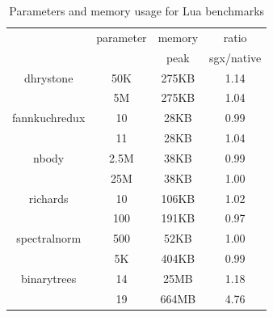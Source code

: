 \newcommand{\lowparamcolor}{\rowcolor[rgb]{0.99,0.79,0.64}\cellcolor{white}}
\newcommand{\higparamcolor}{\rowcolor[rgb]{0.75,0.84,0.91}\cellcolor{white}}
\begin{table}[h!]
    \centering
    \begin{tabular}{|c|c|c|c|}
    \hline
               &parameter  &memory      &ratio \\
               &           &peak        &sgx/native \\
    \hline
\lowparamcolor
dhrystone      &50K        &275KB       & 1.14 \\
\higparamcolor
               &5M         &275KB       & 1.04 \\
    \hline
\lowparamcolor
fannkuchredux  &10         &28KB        & 0.99 \\
\higparamcolor
               &11         &28KB        & 1.04 \\
    \hline
\lowparamcolor
nbody          &2.5M       &38KB        & 0.99 \\
\higparamcolor
               &25M        &38KB        & 1.00 \\
    \hline
\lowparamcolor
richards       &10         &106KB       & 1.02 \\
\higparamcolor
               &100        &191KB       & 0.97 \\
    \hline
\lowparamcolor
spectralnorm   &500        &52KB        & 1.00 \\
\higparamcolor
               &5K         &404KB       & 0.99 \\
    \hline
\lowparamcolor
binarytrees    &14         &25MB        & 1.18 \\
\higparamcolor
               &19         &664MB       & 4.76 \\
    \hline
    \end{tabular}
    \caption{\label{tab:luabmarks}Parameters and memory usage for Lua benchmarks}
\end{table}

